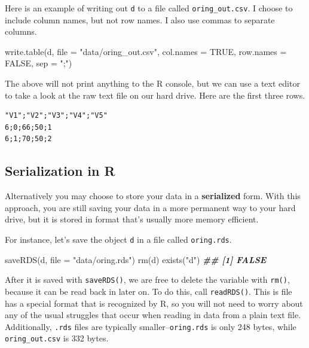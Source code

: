 \documentclass[
  12pt,
  krantz2]{krantz}
\makeatletter
\newenvironment{Shaded}{\begin{snugshade}}{\end{snugshade}}
\newcommand{\AttributeTok}[1]{\textcolor[rgb]{0.61,0.61,0.61}{#1}}
\newcommand{\ConstantTok}[1]{\textcolor[rgb]{0,0,0}{#1}}
\newcommand{\DocumentationTok}[1]{\textcolor[rgb]{0.37,0.37,0.37}{\textbf{\textit{#1}}}}
\newcommand{\FunctionTok}[1]{\textcolor[rgb]{0,0,0}{#1}}
\newcommand{\NormalTok}[1]{#1}
\newcommand{\StringTok}[1]{\textcolor[rgb]{0.5,0.5,0.5}{#1}}
\newenvironment{kframe}{%
\medskip{}
\setlength{\fboxsep}{.8em}
 \def\at@end@of@kframe{}%
 \ifinner\ifhmode%
  \def\at@end@of@kframe{\end{minipage}}%
  \begin{minipage}{\columnwidth}%
 \fi\fi%
 \def\FrameCommand##1{\hskip\@totalleftmargin \hskip-\fboxsep
 \colorbox{shadecolor}{##1}\hskip-\fboxsep
     \hskip-\linewidth \hskip-\@totalleftmargin \hskip\columnwidth}%
 \MakeFramed {\advance\hsize-\width
   \@totalleftmargin\z@ \linewidth\hsize
   \@setminipage}}%
 {\par\unskip\endMakeFramed%
 \at@end@of@kframe}
\renewenvironment{Shaded}{\begin{kframe}}{\end{kframe}}
\makeatother
\begin{document}
Here is an example of writing out \texttt{d} to a file called \texttt{oring\_out.csv}. I choose to include column names, but not row names. I also use commas to separate columns.

\begin{Shaded}
\begin{Highlighting}[]
\FunctionTok{write.table}\NormalTok{(d, }\AttributeTok{file =} \StringTok{"data/oring\_out.csv"}\NormalTok{, }
            \AttributeTok{col.names =} \ConstantTok{TRUE}\NormalTok{, }\AttributeTok{row.names =} \ConstantTok{FALSE}\NormalTok{, }\AttributeTok{sep =} \StringTok{";"}\NormalTok{)}
\end{Highlighting}
\end{Shaded}

The above will not print anything to the R console, but we can use a text editor to take a look at the raw text file on our hard drive. Here are the first three rows.

\begin{verbatim}
"V1";"V2";"V3";"V4";"V5"
6;0;66;50;1
6;1;70;50;2
\end{verbatim}

\hypertarget{serialization-in-r}{%
\subsection{Serialization in R}\label{serialization-in-r}}

Alternatively you may choose to store your data in a \textbf{serialized} form. With this approach, you are still saving your data in a more permanent way to your hard drive, but it is stored in format that's usually more memory efficient.

For instance, let's save the object \texttt{d} in a file called \texttt{oring.rds}.

\begin{Shaded}
\begin{Highlighting}[]
\FunctionTok{saveRDS}\NormalTok{(d, }\AttributeTok{file =} \StringTok{"data/oring.rds"}\NormalTok{)}
\FunctionTok{rm}\NormalTok{(d)}
\FunctionTok{exists}\NormalTok{(}\StringTok{"d"}\NormalTok{)}
\DocumentationTok{\#\# [1] FALSE}
\end{Highlighting}
\end{Shaded}

After it is saved with \texttt{saveRDS()}, we are free to delete the variable with \texttt{rm()}, because it can be read back in later on. To do this, call \texttt{readRDS()}. This is file has a special format that is recognized by R, so you will not need to worry about any of the usual struggles that occur when reading in data from a plain text file. Additionally, \texttt{.rds} files are typically smaller--\texttt{oring.rds} is only 248 bytes, while \texttt{oring\_out.csv} is 332 bytes.
\end{document}
